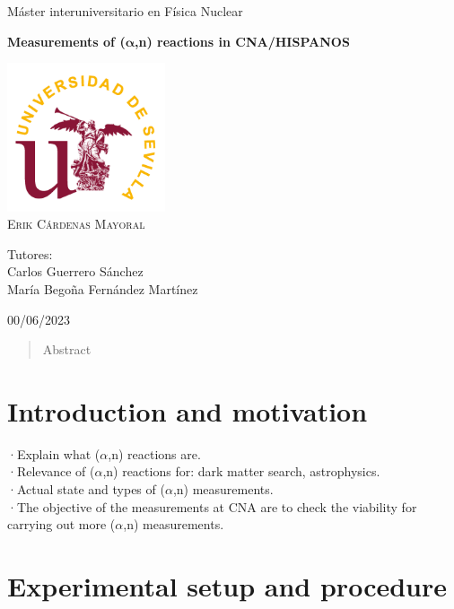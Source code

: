 \documentclass[a4paper,12pt]{report}
\newcommand{\an}{($\alpha$,n) }
\begin{document}
\begin{titlepage}
	\centering
	\Huge Máster interuniversitario en Física Nuclear\par
	\vspace*{3cm}
	\HUGE \textbf{Measurements of ($\bm{\alpha}$,n) reactions in CNA/HISPANOS}\par	%
	\vspace{1cm}
	\includegraphics[width=0.35\textwidth]{us.png}\\
	\vspace{1cm}
	\Large \textsc{Erik Cárdenas Mayoral}\par
	\vspace{2cm}
	Tutores:\\
	Carlos Guerrero Sánchez\\
	María Begoña Fernández Martínez\par
	\vfill
	00/06/2023
\end{titlepage}

\begin{abstract}
Abstract
\end{abstract}

\tableofcontents

\chapter{Introduction and motivation}
·Explain what \an reactions are.\\

·Relevance of \an reactions for: dark matter search, astrophysics.\\

·Actual state and types of \an measurements.\\

·The objective of the measurements at CNA are to check the viability for carrying out more \an measurements.\\


\chapter{Experimental setup and procedure}
\end{document}

